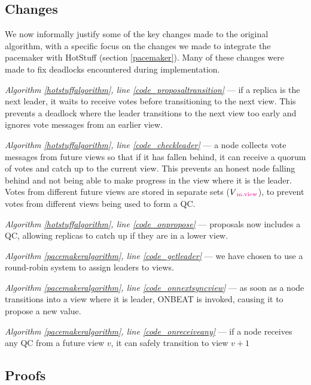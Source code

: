 \subsection{Changes}
We now informally justify some of the key changes made to the original algorithm, with a specific focus on the changes we made to integrate the pacemaker with HotStuff (section \ref{pacemaker}). Many of these changes were made to fix deadlocks encountered during implementation.

\begin{description}
	\item \textit{Algorithm \ref{hotstuffalgorithm}, line \ref{code_proposaltransition}} --- if a replica is the next leader, it waits to receive votes before transitioning to the next view. This prevents a deadlock where the leader transitions to the next view too early and ignores vote messages from an earlier view.
	\item \textit{Algorithm \ref{hotstuffalgorithm}, line \ref{code_checkleader}} --- a node collects vote messages from future views so that if it has fallen behind, it can receive a quorum of votes and catch up to the current view. This prevents an honest node falling behind and not being able to make progress in the view where it is the leader. Votes from different future views are stored in separate sets ($V\textcolor{Magenta}{\textsubscript{m.view}}$), to prevent votes from different views being used to form a QC.
	\item \textit{Algorithm \ref{hotstuffalgorithm}, line \ref{code_onpropose}} --- proposals now includes a QC, allowing replicas to catch up if they are in a lower view.
	\item \textit{Algorithm \ref{pacemakeralgorithm}, line \ref{code_getleader}} --- we have chosen to use a round-robin system to assign leaders to views.
	\item \textit{Algorithm \ref{pacemakeralgorithm}, line \ref{code_onnextsyncview}} --- as soon as a node transitions into a view where it is leader, ON{\large B}EAT is invoked, causing it to propose a new value.
	\item \textit{Algorithm \ref{pacemakeralgorithm}, line \ref{code_onreceiveany}} --- if a node receives any QC from a future view $v$, it can safely transition to view $v + 1$
\end{description}

\subsection{Proofs} \label{proof}


